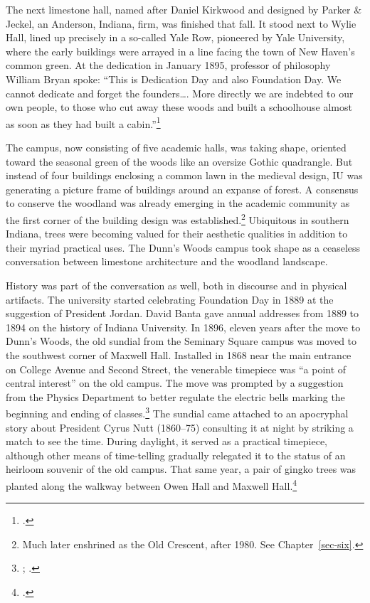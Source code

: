 \documentclass[
  american,
  letterpaper,
]{scrreprt}
\begin{document}
The next limestone hall, named after Daniel Kirkwood and designed by
Parker \& Jeckel, an Anderson, Indiana, firm, was finished that fall. It
stood next to Wylie Hall, lined up precisely in a so-called Yale Row,
pioneered by Yale University, where the early buildings were arrayed in
a line facing the town of New Haven's common green. At the dedication in
January 1895, professor of philosophy William Bryan spoke: ``This is
Dedication Day and also Foundation Day. We cannot dedicate and forget
the founders\ldots. More directly we are indebted to our own people, to
those who cut away these woods and built a schoolhouse almost as soon as
they had built a cabin.''\footnote{.}

The campus, now consisting of five academic halls, was taking shape,
oriented toward the seasonal green of the woods like an oversize Gothic
quadrangle. But instead of four buildings enclosing a common lawn in the
medieval design, IU was generating a picture frame of buildings around
an expanse of forest. A consensus to conserve the woodland was already
emerging in the academic community as the first corner of the building
design was established.\footnote{Much later enshrined as the Old
  Crescent, after 1980. See Chapter~\ref{sec-six}.} Ubiquitous in
southern Indiana, trees were becoming valued for their aesthetic
qualities in addition to their myriad practical uses. The Dunn's Woods
campus took shape as a ceaseless conversation between limestone
architecture and the woodland landscape.

History was part of the conversation as well, both in discourse and in
physical artifacts. The university started celebrating Foundation Day in
1889 at the suggestion of President Jordan. David Banta gave annual
addresses from 1889 to 1894 on the history of Indiana University. In
1896, eleven years after the move to Dunn's Woods, the old sundial from
the Seminary Square campus was moved to the southwest corner of Maxwell
Hall. Installed in 1868 near the main entrance on College Avenue and
Second Street, the venerable timepiece was ``a point of central
interest'' on the old campus. The move was prompted by a suggestion from
the Physics Department to better regulate the electric bells marking the
beginning and ending of classes.\footnote{;
  .} The sundial came attached to an apocryphal story
about President Cyrus Nutt (1860--75) consulting it at night by striking
a match to see the time. During daylight, it served as a practical
timepiece, although other means of time-telling gradually relegated it
to the status of an heirloom souvenir of the old campus. That same year,
a pair of gingko trees was planted along the walkway between Owen Hall
and Maxwell Hall.\footnote{.}
\end{document}
